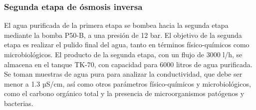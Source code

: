\subsubsection{Segunda etapa de ósmosis inversa}

El agua purificada de la primera etapa se bombea hacia la segunda etapa mediante la bomba P50-B, a una presión de 12 bar. El objetivo de la segunda etapa es realizar el pulido final del agua, tanto en términos físico-químicos como microbiológicos. El producto de la segunda etapa, con un flujo de 3000 l/h, se almacena en el tanque TK-70, con capacidad para 6000 litros de agua purificada. Se toman muestras de agua pura para analizar la conductividad, que debe ser menor a 1.3 µS/cm, así como otros parámetros físico-químicos y microbiológicos, como el carbono orgánico total y la presencia de microorganismos patógenos y bacterias.